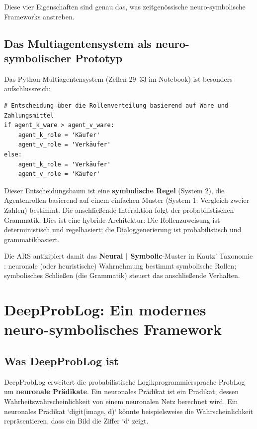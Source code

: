\documentclass[12pt,a4paper]{article}
\begin{document}
Diese vier Eigenschaften sind genau das, was zeitgenössische neuro-symbolische 
Frameworks anstreben.

\subsection{Das Multiagentensystem als neuro-symbolischer Prototyp}

Das Python-Multiagentensystem (Zellen 29--33 im Notebook) ist besonders 
aufschlussreich:

\begin{lstlisting}[caption=Multiagenten-Rollenzuweisung]
# Entscheidung über die Rollenverteilung basierend auf Ware und Zahlungsmittel
if agent_k_ware > agent_v_ware:
    agent_k_role = 'Käufer'
    agent_v_role = 'Verkäufer'
else:
    agent_k_role = 'Verkäufer'
    agent_v_role = 'Käufer'
\end{lstlisting}

Dieser Entscheidungsbaum ist eine \textbf{symbolische Regel} (System 2), die 
Agentenrollen basierend auf einem einfachen Muster (System 1: Vergleich zweier 
Zahlen) bestimmt. Die anschließende Interaktion folgt der probabilistischen 
Grammatik. Dies ist eine hybride Architektur: Die Rollenzuweisung ist 
deterministisch und regelbasiert; die Dialoggenerierung ist probabilistisch 
und grammatikbasiert.

Die ARS antizipiert damit das \textbf{Neural | Symbolic}-Muster in Kautz' 
Taxonomie \citep{kautz2020third}: neuronale (oder heuristische) Wahrnehmung 
bestimmt symbolische Rollen; symbolisches Schließen (die Grammatik) steuert 
das anschließende Verhalten.

\section{DeepProbLog: Ein modernes neuro-symbolisches Framework}

\subsection{Was DeepProbLog ist}

DeepProbLog \citep{manhaeve2018deepproblog} erweitert die probabilistische 
Logikprogrammiersprache ProbLog um \textbf{neuronale Prädikate}. Ein neuronales 
Prädikat ist ein Prädikat, dessen Wahrheitswahrscheinlichkeit von einem 
neuronalen Netz berechnet wird. Ein neuronales Prädikat `digit(image, d)` könnte 
beispielsweise die Wahrscheinlichkeit repräsentieren, dass ein Bild die Ziffer 
`d` zeigt.
\end{document}
